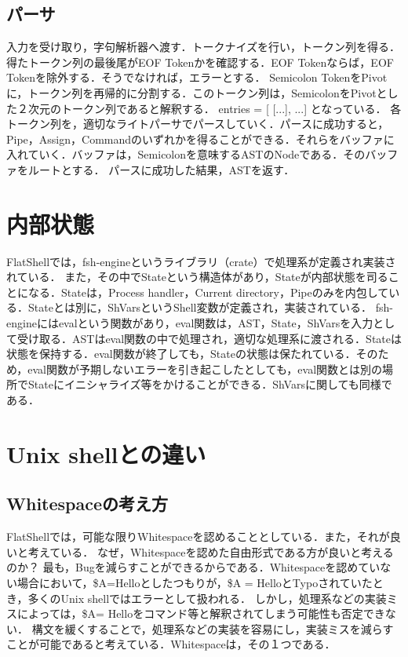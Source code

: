 \documentclass{article}
\begin{document}
\subsection{パーサ}
入力を受け取り，字句解析器へ渡す．トークナイズを行い，トークン列を得る．得たトークン列の最後尾がEOF Tokenかを確認する．EOF Tokenならば，EOF Tokenを除外する．そうでなければ，エラーとする．\newline
Semicolon TokenをPivotに，トークン列を再帰的に分割する．このトークン列は，SemicolonをPivotとした２次元のトークン列であると解釈する．\newline
entries = [ [...], ...] となっている．\newline
各トークン列を，適切なライトパーサでパースしていく．パースに成功すると，Pipe，Assign，Commandのいずれかを得ることができる．それらをバッファに入れていく．バッファは，Semicolonを意味するASTのNodeである．そのバッファをルートとする．\newline
パースに成功した結果，ASTを返す．

\section{内部状態}
FlatShellでは，fsh-engineというライブラリ（crate）で処理系が定義され実装されている．\newline
また，その中でStateという構造体があり，Stateが内部状態を司ることになる．Stateは，Process handler，Current directory，Pipeのみを内包している．Stateとは別に，ShVarsというShell変数が定義され，実装されている．\newline
fsh-engineにはevalという関数があり，eval関数は，AST，State，ShVarsを入力として受け取る．ASTはeval関数の中で処理され，適切な処理系に渡される．Stateは状態を保持する．eval関数が終了しても，Stateの状態は保たれている．そのため，eval関数が予期しないエラーを引き起こしたとしても，eval関数とは別の場所でStateにイニシャライズ等をかけることができる．ShVarsに関しても同様である．

\section{Unix shellとの違い}

\subsection{Whitespaceの考え方}
FlatShellでは，可能な限りWhitespaceを認めることとしている．また，それが良いと考えている．\newline
なぜ，Whitespaceを認めた自由形式である方が良いと考えるのか？ 最も，Bugを減らすことができるからである．Whitespaceを認めていない場合において，\$A=Helloとしたつもりが，\$A = HelloとTypoされていたとき，多くのUnix shellではエラーとして扱われる．\newline
しかし，処理系などの実装ミスによっては，\$A= Helloをコマンド等と解釈されてしまう可能性も否定できない．\newline
構文を緩くすることで，処理系などの実装を容易にし，実装ミスを減らすことが可能であると考えている．Whitespaceは，その１つである．
\end{document}
